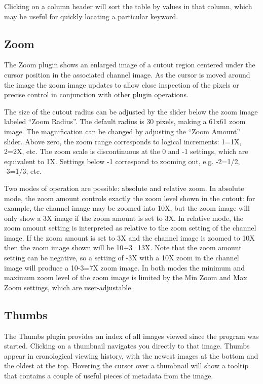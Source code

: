 \documentclass[11pt]{report}
\begin{document}
Clicking on a column header will sort the table by values in that
column, which may be useful for quickly locating a particular keyword.

\subsection{Zoom}
The Zoom plugin shows an enlarged image of a cutout region centered
under the cursor position in the associated channel image.  As the
cursor is moved around the image the zoom image updates to allow close
inspection of the pixels or precise control in conjunction with other
plugin operations.

The size of the cutout radius can be adjusted by the slider below the
zoom image labeled ``Zoom Radius''. The default radius is 30 pixels,
making a 61x61 zoom image.  The magnification can be changed by
adjusting the ``Zoom Amount'' slider.
Above zero, the zoom range corresponds to logical increments: 1=1X,
2=2X, etc.  The zoom scale is discontinuous at the 0 and -1 settings,
which are equivalent to 1X.  Settings below -1 correspond to zooming out,
e.g. -2=1/2, -3=1/3, etc. 

Two modes of operation are possible: absolute and relative zoom.  In
absolute mode, the zoom amount controls exactly the zoom level shown in
the cutout: for example, the channel image may be zoomed into 10X, but
the zoom image will only show a 3X image if the zoom amount is set to
3X.
In relative mode, the zoom amount setting is interpreted as relative to
the zoom setting of the channel image.  If the zoom amount is set to 3X
and the channel image is zoomed to 10X then the zoom image shown will be
10+3=13X.  Note that the zoom amount setting can be negative, so a
setting of -3X with a 10X zoom in the channel image will produce a
10-3=7X zoom image.
In both modes the minimum and maximum zoom level of the zoom image is
limited by the Min Zoom and Max Zoom settings, which are
user-adjustable.  

\subsection{Thumbs}
The Thumbs plugin provides an index of all images viewed since the
program was started.  Clicking on a thumbnail navigates you directly to
that image.  Thumbs appear in cronological viewing history, with the
newest images at the bottom and the oldest at the top.  Hovering the
cursor over a thumbnail will show a tooltip that contains a couple of
useful pieces of metadata from the image.
\end{document}
